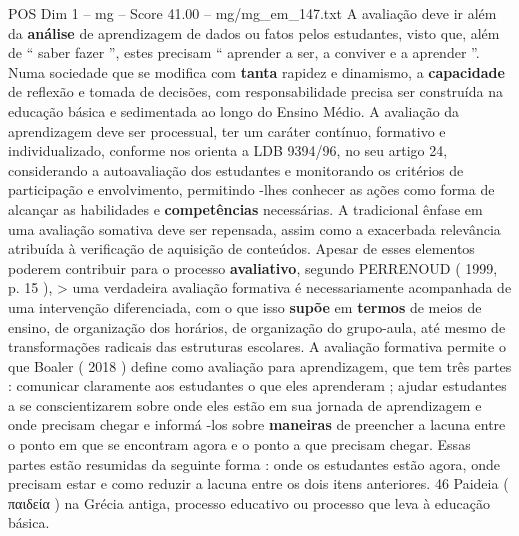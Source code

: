 \begin{textsample}{POS Dim 1 – mg – Score 41.00 – mg/mg\_em\_147.txt}
A avaliação deve ir além da \textbf{análise} de aprendizagem de dados ou fatos pelos estudantes, visto que, além de “ saber fazer ”, estes precisam “ aprender a ser, a conviver e a aprender ”.
Numa sociedade que se modifica com \textbf{tanta} rapidez e dinamismo, a \textbf{capacidade} de reflexão e tomada de decisões, com responsabilidade precisa ser construída na educação básica e sedimentada ao longo do Ensino Médio.
A avaliação da aprendizagem deve ser processual, ter um caráter contínuo, formativo e individualizado, conforme nos orienta a LDB 9394/96, no seu artigo 24, considerando a autoavaliação dos estudantes e monitorando os critérios de participação e envolvimento, permitindo -lhes conhecer as ações como forma de alcançar as habilidades e \textbf{competências} necessárias.
A tradicional ênfase em uma avaliação somativa deve ser repensada, assim como a exacerbada relevância atribuída à verificação de aquisição de conteúdos.
Apesar de esses elementos poderem contribuir para o processo \textbf{avaliativo}, segundo PERRENOUD ( 1999, p. 15 ), > uma verdadeira avaliação formativa é necessariamente acompanhada de uma intervenção diferenciada, com o que isso \textbf{supõe} em \textbf{termos} de meios de ensino, de organização dos horários, de organização do grupo-aula, até mesmo de transformações radicais das estruturas escolares.
A avaliação formativa permite o que Boaler ( 2018 ) define como avaliação para aprendizagem, que tem três partes : comunicar claramente aos estudantes o que eles aprenderam ; ajudar estudantes a se conscientizarem sobre onde eles estão em sua jornada de aprendizagem e onde precisam chegar e informá -los sobre \textbf{maneiras} de preencher a lacuna entre o ponto em que se encontram agora e o ponto a que precisam chegar.
Essas partes estão resumidas da seguinte forma : onde os estudantes estão agora, onde precisam estar e como reduzir a lacuna entre os dois itens anteriores. 46 Paideia ( παιδεία ) na Grécia antiga, processo educativo ou processo que leva à educação básica.

\end{textsample}
